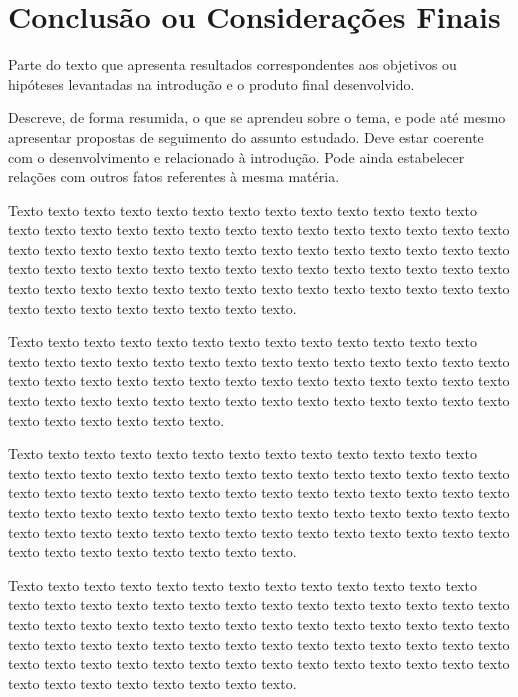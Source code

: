 \chapter{Conclusão ou Considerações Finais}

Parte do texto que apresenta resultados correspondentes aos objetivos ou 
hipóteses levantadas na introdução e o produto final desenvolvido. 

Descreve, de forma resumida, o que se aprendeu sobre o tema, e pode até 
mesmo apresentar propostas de seguimento do assunto estudado. Deve estar 
coerente com o desenvolvimento e relacionado à introdução. Pode ainda estabelecer 
relações com outros fatos referentes à mesma matéria. 

Texto texto texto texto texto texto texto texto texto texto texto texto texto texto 
texto texto texto texto texto texto texto texto texto texto texto texto texto texto texto 
texto texto texto texto texto texto texto texto texto texto texto texto texto texto texto 
texto texto texto texto texto texto texto texto texto texto texto texto texto texto texto 
texto texto texto texto texto texto texto texto texto texto texto texto texto texto texto 
texto texto texto. 

Texto texto texto texto texto texto texto texto texto texto texto texto texto texto 
texto texto texto texto texto texto texto texto texto texto texto texto texto texto texto 
texto texto texto texto texto texto texto texto texto texto texto texto texto texto texto 
texto texto texto texto texto texto texto texto texto texto texto texto texto texto texto 
texto texto. 

Texto texto texto texto texto texto texto texto texto texto texto texto texto texto 
texto texto texto texto texto texto texto texto texto texto texto texto texto texto texto 
texto texto texto texto texto texto texto texto texto texto texto texto texto texto texto 
texto texto texto texto texto texto texto texto texto texto texto texto texto texto texto 
texto texto texto texto texto texto texto texto texto texto texto texto texto texto texto 
texto texto texto. 

Texto texto texto texto texto texto texto texto texto texto texto texto texto texto 
texto texto texto texto texto texto texto texto texto texto texto texto texto texto texto 
texto texto texto texto texto texto texto texto texto texto texto texto texto texto texto 
texto texto texto texto texto texto texto texto texto texto texto texto texto texto texto 
texto texto texto texto texto texto texto texto texto texto texto texto texto texto texto 
texto texto texto.